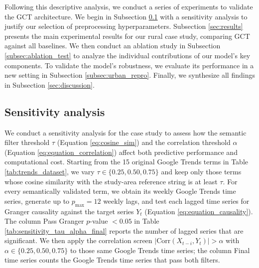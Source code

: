 \documentclass[acmsmall]{acmart}
\begin{document}
{Following this descriptive analysis, we conduct a series of experiments to validate the GCT {\color{blue}architecture}. We begin in Subsection \ref{sec:sensitivity_anal} with a sensitivity analysis to justify our selection of preprocessing hyperparameters. Subsection \ref{sec:results} presents the main experimental results for our rural case study, comparing GCT against all baselines. We then conduct an ablation study in Subsection \ref{subsec:ablation_test} to analyze the individual contributions of our model's key components. To validate the model's robustness, we evaluate its performance in a new setting in Subsection \ref{subsec:urban_repro}. Finally, we synthesize all findings in Subsection \ref{sec:discussion}.
}







{\color{black}
\subsection{Sensitivity analysis} \label{sec:sensitivity_anal}

We conduct a sensitivity analysis for the case study to assess how the semantic filter threshold $\tau$ (Equation \ref{eq:cosine_sim}) and the correlation threshold $\alpha$ (Equation \ref{eq:equation_correlation}) affect both predictive performance and computational cost. Starting from the 15 original Google Trends terms in Table \ref{tab:trends_dataset}, we vary $\tau\in\{0.25, 0.50, 0.75\}$ and keep only those terms whose cosine similarity with the study-area reference string is at least $\tau$. For every semantically validated term, we obtain its weekly Google Trends time series, generate up to $p_{\max}=12$ weekly lags, and test each lagged time series for Granger causality against the target series $Y_t$ (Equation \ref{eq:equation_causality}). The column Pass Granger $p$-value $<0.05$ in Table \ref{tab:sensitivity_tau_alpha_final} reports the number of lagged series that are significant. We then apply the correlation screen $|\mathrm{Corr}(X_{t-i},Y_t)|>\alpha$ with $\alpha\in\{0.25, 0.50, 0.75\}$ to those same Google Trends time series; the column Final time series counts the Google Trends time series that pass both filters.
}
\end{document}

